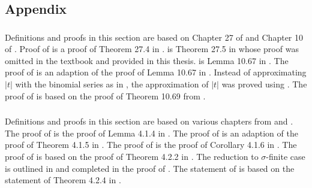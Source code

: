\subsection{Appendix}

\subsubsection{}
Definitions and proofs in this section are based on Chapter 27 of \cite{ross_2015_elementary} and Chapter 10 of \cite{wade_2014_introduction}. Proof of  is a proof of Theorem 27.4 in \cite{ross_2015_elementary}.  is Theorem 27.5 in \cite{ross_2015_elementary} whose proof was omitted in the textbook and provided in this thesis.  is Lemma 10.67 in \cite{wade_2014_introduction}. The proof of  is an adaption of the proof of Lemma 10.67 in \cite{wade_2014_introduction}. Instead of approximating $|t|$ with the binomial series as in \cite{wade_2014_introduction}, the approximation of $|t|$ was proved using . The proof of  is based on the proof of Theorem 10.69 from \cite{wade_2014_introduction}.

\subsubsection{}
Definitions and proofs in this section are based on various chapters from \cite{cohn_2013_measure}
and \cite{bass2011real}. The proof of  is the proof of Lemma 4.1.4 in \cite{cohn_2013_measure}. The proof of  is an adaption of the proof of Theorem 4.1.5 in \cite{cohn_2013_measure}. The proof of  is the proof of Corollary 4.1.6 in \cite{cohn_2013_measure}. The proof of  is based on the proof of Theorem 4.2.2 in \cite{cohn_2013_measure}. The reduction to $\sigma$-finite case is outlined in \cite{cohn_2013_measure} and completed in the proof of . The statement of  is based on the statement of Theorem 4.2.4 in \cite{cohn_2013_measure}.

